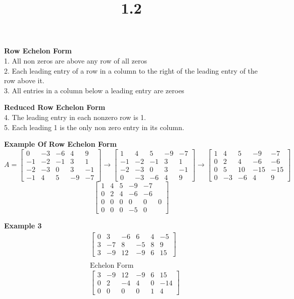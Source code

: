 \documentclass{article}
\title{1.2}
\begin{document}
  \maketitle
  \textbf{Row Echelon Form}\\
  1. All non zeros are above any row of all zeros\\
  2. Each leading entry of a row in a column to the right of the leading entry of the row above it.\\
  3. All entries in a column below a leading entry are zeroes

  \textbf{Reduced Row Echelon Form}\\
  4. The leading entry in each nonzero row is 1.\\
  5. Each leading 1 is the only non zero entry in its column.

  \textbf{Example Of Row Echelon Form}
  \[
    A =
    \begin{bmatrix}
      0 & -3 & -6 & 4 & 9\\
      -1 & -2 & -1 &3 &1 \\
      -2 & -3 &0 &3 &-1\\
      -1 &4 &5 &-9 &-7
    \end{bmatrix} \to
    \begin{bmatrix}
      1 &4 & 5 & -9 &-7 \\
      -1 & -2 & -1 &3 &1 \\
      -2 & -3 &0 &3 &-1\\
      0 &-3 &-6 &4 &9
    \end{bmatrix} \to 
    \begin{bmatrix}
      1 &4 &5 &-9 &-7\\
      0 &2 &4 &-6 &-6\\
      0 &5 &10 &-15 &-15\\
      0 &-3 &-6 &4 &9
    \end{bmatrix}
  \]
  \[
    \begin{bmatrix}
      1 &4 &5 &-9 &-7\\
      0 &2 &4 &-6 &-6\\
      0 &0 &0 & 0 &0 &0\\
      0 &0 &0 &-5 &0
    \end{bmatrix}
  \]
  
  \textbf{Example 3}
  \[
    \begin{aligned}
    &	\begin{bmatrix}
      0 &3 &-6 &6 &4 &-5\\
      3 &-7 &8 &-5 &8 &9\\
      3 &-9 &12 &-9 &6 &15
    \end{bmatrix}\\
    ~\\
    &\text{Echelon Form}\\
    &\begin{bmatrix}
      3 &-9 &12 &-9 &6 &15\\
      0 &2 &-4 &4 &0 &-14\\
      0 &0 &0 &0 &1 &4
    \end{bmatrix}
    \end{aligned}
  \]
\end{document}
